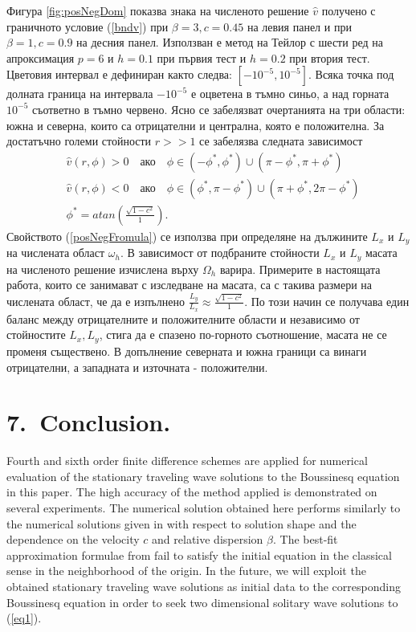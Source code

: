 \documentclass{article}
\newcommand{\rf}[1]{(\ref{#1})}
\begin{document}
\FloatBarrier
Фигура \ref{fig:posNegDom} показва знака на численото решение $\widehat v$ получено с граничното условие \rf{bndv} при $\beta=3, c=0.45$ на левия панел и при $\beta=1, c=0.9$ на десния панел. Използван е метод на Тейлор с шести ред на апроксимация $p=6$ и $h=0.1$ при първия тест и $h=0.2$ при втория тест. Цветовия интервал е дефиниран както следва: $[-10^{-5}, 10^{-5}]$. Всяка точка под долната граница на интервала $-10^{-5}$ е оцветена в тъмно синьо, а над горната $10^{-5}$ съответно в тъмно червено. Ясно се забелязват очертанията на три области: южна и северна, които са отрицателни и централна, която е положителна. За достатъчно големи стойности $r >> 1$ се забелязва следната зависимост
\begin{align}\label{posNegFromula}
&\widehat v(r, \phi) > 0 \quad \text{ако} \quad \phi \in (-\phi^*, \phi^*) \cup (\pi - \phi^*, \pi + \phi^*)  \nonumber\\
&\widehat v(r, \phi) < 0 \quad \text{ако} \quad \phi \in (\phi^*, \pi - \phi^*) \cup (\pi + \phi^*, 2\pi-\phi^*) \nonumber\\
&\phi^* = atan(\frac{ \sqrt{1-c^2} }{ 1}).
\end{align}
Свойството \rf{posNegFromula} се използва при определяне на дължините $L_x$ и $L_y$ на числената област $\omega_h$. В зависимост от подбраните стойности $L_x$ и $L_y$ масата на численото решение изчислена върху $\Omega_h$ варира. Примерите в настоящата работа, които се занимават с изследване на масата, са с такива размери на числената област, че да е изпълнено $\frac{L_y}{L_x} \approx \frac{ \sqrt{1-c^2} }{ 1}$. По този начин се получава един баланс между отрицателните и положителните области и независимо от стойностите $L_x, L_y$, стига да е спазено по-горното съотношение, масата не се променя съществено. В допълнение северната и южна граници са винаги отрицателни, а западната и източната -  положителни.
\section{7.~Conclusion.}
Fourth and sixth order finite difference schemes are applied for numerical evaluation of the stationary traveling wave solutions to the Boussinesq equation in this paper. The high accuracy of the method applied is demonstrated on several experiments. The numerical solution obtained here performs similarly to the numerical solutions given in \cite{Ch2012,Ch2011} with respect to solution shape and the dependence on the velocity $c$ and relative dispersion $\beta$. 
The best-fit approximation formulae from \cite{Ch2011} fail to satisfy the initial equation in the classical sense in the neighborhood of the origin. 
In the future, we will exploit the obtained stationary traveling wave solutions as initial data to the corresponding Boussinesq equation in order to seek two dimensional solitary wave solutions to \rf{eq1}.
\end{document}
